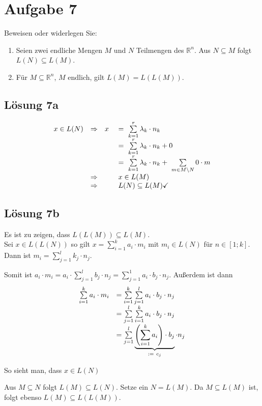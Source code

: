 \documentclass[main.tex]{subfiles}
\begin{document}
\section{Aufgabe 7}

Beweisen oder widerlegen Sie:
\begin{enumerate}
    \item Seien zwei endliche Mengen $M$ und $N$ Teilmengen des $\mathbb{R}^{n}$. Aus $N\subseteq M$ folgt $L( N) \subseteq L( M)$.
    \item Für $M\subseteq \mathbb{R}^{n}$, $M$ endlich, gilt $L( M) =L( L( M))$.
\end{enumerate}

\subsection{Lösung 7a}

\begin{equation*}
    \begin{array}{ c c r l }
    x\in L( N) & \Rightarrow  & x\  & =\ \sum\limits _{k=1}^{r} \lambda _{k} \cdotp n_{k}\\
     &  &  & =\ \sum\limits _{k=1}^{r} \lambda _{k} \cdotp n_{k} +0\\
     &  &  & =\ \sum\limits _{k=1}^{r} \lambda _{k} \cdotp n_{k} +\ \sum\limits _{m\in M\setminus N} 0\cdotp m\\
     & \Rightarrow  &  & x\in L( M)\\
     & \Rightarrow  &  & L( N) \subseteq L( M) \checked
    \end{array}
\end{equation*}
    

\subsection{Lösung 7b}
Es ist zu zeigen, dass $L(L(M)) \subseteq L(M)$.\\

Sei $x\in L( L( N))$ so gilt $x=\sum\limits _{i=1}^{k} a_{i} \cdotp m_{i}$ mit $m_{i} \in L( N)$ für $n\in [ 1;k]$. Dann ist $m_{i} =\sum\limits _{j=1}^{l} k_{j} \cdotp n_{j}$. 

Somit ist $a_{i} \cdotp m_{i} =a_{i} \cdotp \sum\limits _{j=1}^{l} b_{j} \cdotp n_{j} =\sum\limits _{j=1}^{1} a_{i} \cdotp b_{j} \cdotp n_{j}$. Außerdem ist dann
\begin{equation*}
    \begin{array}{ c l }
    \sum\limits _{i=1}^{k} a_{i} \cdotp m_{i} & =\sum\limits _{i=1}^{k}\sum\limits _{j=1}^{l} a_{i} \cdotp b_{j} \cdotp n_{j}\\
    & =\sum\limits _{j=1}^{l}\sum\limits _{i=1}^{k} a_{i} \cdotp b_{j} \cdotp n_{j}\\
    & =\sum\limits _{j=1}^{l}\underbrace{\left(\sum\limits _{i=1}^{k} a_{i}\right) \cdotp b_{j}}_{:=\ c_{j}} \cdotp n_{j}
    \end{array}
\end{equation*}

So sieht man, dass $x\in L( N)$ \checked

Aus $M\subseteq N$ folgt $L( M) \subseteq L( N)$. Setze ein $N=L( M)$. Da $M\subseteq L( M)$ ist, folgt ebenso $L( M) \subseteq L( L( M))$. \checked
\end{document}
